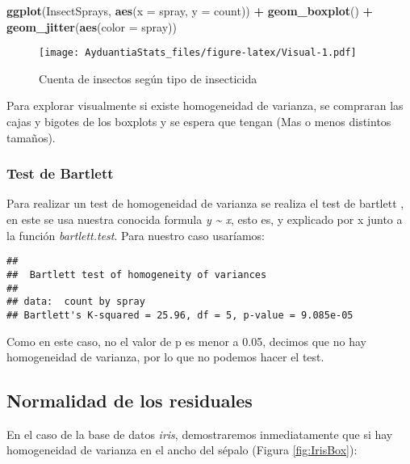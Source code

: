 \documentclass[]{book}
\newenvironment{Shaded}{\begin{snugshade}}{\end{snugshade}}
\newcommand{\DataTypeTok}[1]{\textcolor[rgb]{0.13,0.29,0.53}{#1}}
\newcommand{\KeywordTok}[1]{\textcolor[rgb]{0.13,0.29,0.53}{\textbf{#1}}}
\newcommand{\NormalTok}[1]{#1}
\newcommand{\OperatorTok}[1]{\textcolor[rgb]{0.81,0.36,0.00}{\textbf{#1}}}
\newcommand{\StringTok}[1]{\textcolor[rgb]{0.31,0.60,0.02}{#1}}
\begin{document}
\begin{Shaded}
\begin{Highlighting}[]
\KeywordTok{ggplot}\NormalTok{(InsectSprays, }\KeywordTok{aes}\NormalTok{(}\DataTypeTok{x =}\NormalTok{ spray, }\DataTypeTok{y =}\NormalTok{ count)) }\OperatorTok{+}\StringTok{ }\KeywordTok{geom_boxplot}\NormalTok{() }\OperatorTok{+}\StringTok{ }\KeywordTok{geom_jitter}\NormalTok{(}\KeywordTok{aes}\NormalTok{(}\DataTypeTok{color =}\NormalTok{ spray)) }
\end{Highlighting}
\end{Shaded}

\begin{figure}
\centering
\texttt{[image: AyduantiaStats\_files/figure-latex/Visual-1.pdf]}
\caption{\label{fig:Visual}Cuenta de insectos según tipo de insecticida}
\end{figure}

Para explorar visualmente si existe homogeneidad de varianza, se compraran las cajas y bigotes de los boxplots y se espera que tengan (Mas o menos distintos tamaños).

\hypertarget{test-de-bartlett}{%
\subsubsection{Test de Bartlett}\label{test-de-bartlett}}

Para realizar un test de homogeneidad de varianza se realiza el test de bartlett \citep{bartlett1937properties}, en este se usa nuestra conocida formula \emph{y \textasciitilde{} x}, esto es, y explicado por x junto a la función \emph{bartlett.test}. Para nuestro caso usaríamos:

\begin{verbatim}
## 
##  Bartlett test of homogeneity of variances
## 
## data:  count by spray
## Bartlett's K-squared = 25.96, df = 5, p-value = 9.085e-05
\end{verbatim}

Como en este caso, no el valor de p es menor a 0.05, decimos que no hay homogeneidad de varianza, por lo que no podemos hacer el test.

\hypertarget{normalidad-de-los-residuales}{%
\subsection{Normalidad de los residuales}\label{normalidad-de-los-residuales}}

En el caso de la base de datos \emph{iris}, demostraremos inmediatamente que si hay homogeneidad de varianza en el ancho del sépalo (Figura \ref{fig:IrisBox}):
\end{document}

